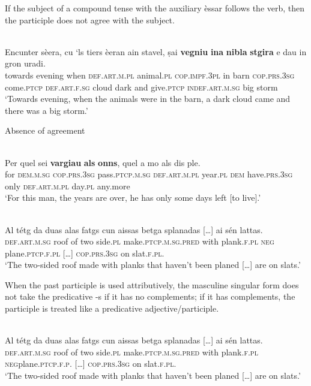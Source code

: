If the subject of a compound tense with the auxiliary èssar follows the verb, then the participle does not agree with the subject.

\ea\label{}
\\
\gll    Encunter sèera, cu ‘ls tiers èeran ain stavel, ṣai \textbf{vegniu} \textbf{ina} \textbf{nibla} \textbf{stgira} e dau in gron uradi. \\
    towards evening when \textsc{def.art.m.pl} animal.\textsc{pl} \textsc{cop.impf.3pl} in barn \textsc{cop.prs.3sg} come.\textsc{ptcp} \textsc{def.art.f.sg} cloud dark and give.\textsc{ptcp} \textsc{indef.art.m.sg} big storm\\
\glt `Towards evening, when the animals were in the barn, a dark cloud came and there was a big storm.'
\z

Absence of agreement

\ea\label{ex:1:}
\\
\gll  Per quel sei \textbf{vargiau} \textbf{als} \textbf{onns}, quel a mo als dis ple.\\
    for \textsc{dem.m.sg} \textsc{cop.prs.3sg} pass.\textsc{ptcp.m.sg} \textsc{def.art.m.pl} year.\textsc{pl}   \textsc{dem}  have.\textsc{prs.3sg} only \textsc{def.art.m.pl} day.\textsc{pl} any.more\\
\glt `For this man, the years are over, he has only some days left [to live].'
\z

\ea\label{}
\\
\gll  Al tétg da duas alas fatgs cun aissas betga splanadas […] ai sén lattas.\\
   \textsc{def.art.m.sg} roof of two side.\textsc{pl} make.\textsc{ptcp.m.sg.pred} with plank.\textsc{f.pl} \textsc{neg} plane.\textsc{ptcp.f.pl} […] \textsc{cop.prs.3sg} on slat.\textsc{f.pl.}\\
\glt `The two-sided roof made with planks that haven't been planed […] are on slats.'
\z


When the past participle is used attributively, the masculine singular form does not take the predicative -s if it has no complements; if it has complements, the participle is treated like a predicative adjective/participle.

\ea\label{}
\\
\gll  Al tétg da duas alas fatgs cun aissas betga splanadas […] ai sén lattas.\\
   \textsc{def.art.m.sg} roof of two side.\textsc{pl} make.\textsc{ptcp.m.sg.pred} with plank.\textsc{f.pl} \textsc{neg}plane.\textsc{ptcp.f.p.} […] \textsc{cop.prs.3sg} on slat.\textsc{f.pl.}\\
\glt `The two-sided roof made with planks that haven't been planed […] are on slats.'
\z




